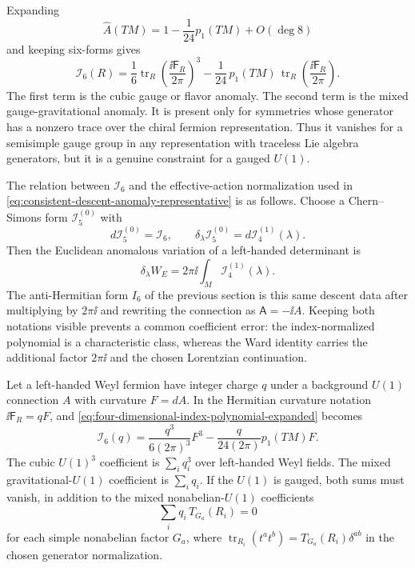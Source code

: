 Expanding
\[
  \widehat A(TM)=1-\frac1{24}p_1(TM)+O(\deg 8)
\]
and keeping six-forms gives
\begin{equation}
  \mathcal I_6(R)
  =
  \frac16
  \operatorname{tr}_R
  \left(\frac{\ii\mathsf F_R}{2\pi}\right)^3
  -
  \frac1{24}\,
  p_1(TM)\,
  \operatorname{tr}_R
  \left(\frac{\ii\mathsf F_R}{2\pi}\right).
  \label{eq:four-dimensional-index-polynomial-expanded}
\end{equation}
The first term is the cubic gauge or flavor anomaly.  The second term is the
mixed gauge-gravitational anomaly.  It is present only for symmetries whose
generator has a nonzero trace over the chiral fermion representation.  Thus it
vanishes for a semisimple gauge group in any representation with traceless Lie
algebra generators, but it is a genuine constraint for a gauged \(U(1)\).

The relation between \(\mathcal I_6\) and the effective-action normalization
used in \eqref{eq:consistent-descent-anomaly-representative} is as follows.
Choose a Chern--Simons form \(\mathcal I_5^{(0)}\) with
\[
  d\mathcal I_5^{(0)}=\mathcal I_6,
  \qquad
  \delta_\lambda\mathcal I_5^{(0)}
  =
  d\mathcal I_4^{(1)}(\lambda).
\]
Then the Euclidean anomalous variation of a left-handed determinant is
\begin{equation}
  \delta_\lambda W_E
  =
  2\pi\ii\int_M
  \mathcal I_4^{(1)}(\lambda).
  \label{eq:index-polynomial-effective-action-normalization}
\end{equation}
The anti-Hermitian form \(I_6\) of the previous section is this same descent
data after multiplying by \(2\pi\ii\) and rewriting the connection as
\(\mathsf A=-\ii A\).  Keeping both notations visible prevents a common
coefficient error: the index-normalized polynomial is a characteristic class,
whereas the Ward identity carries the additional factor \(2\pi\ii\) and the
chosen Lorentzian continuation.

\begin{example}
\label{ex:u1-index-anomaly-polynomial}
Let a left-handed Weyl fermion have integer charge \(q\) under a background
\(U(1)\) connection \(A\) with curvature \(F=dA\).  In the Hermitian curvature
notation \( \ii\mathsf F_R=qF \), and
\eqref{eq:four-dimensional-index-polynomial-expanded} becomes
\begin{equation}
  \mathcal I_6(q)
  =
  \frac{q^3}{6(2\pi)^3}F^3
  -
  \frac{q}{24(2\pi)}p_1(TM)F .
  \label{eq:u1-index-anomaly-polynomial}
\end{equation}
The cubic \(U(1)^3\) coefficient is \(\sum_i q_i^3\) over left-handed Weyl
fields.  The mixed gravitational-\(U(1)\) coefficient is
\(\sum_i q_i\).  If the \(U(1)\) is gauged, both sums must vanish, in addition
to the mixed nonabelian-\(U(1)\) coefficients
\[
  \sum_i q_i\,T_{G_a}(R_i)=0
\]
for each simple nonabelian factor \(G_a\), where
\(\operatorname{tr}_{R_i}(t^a t^b)=T_{G_a}(R_i)\delta^{ab}\) in the chosen
generator normalization.
\end{example}

